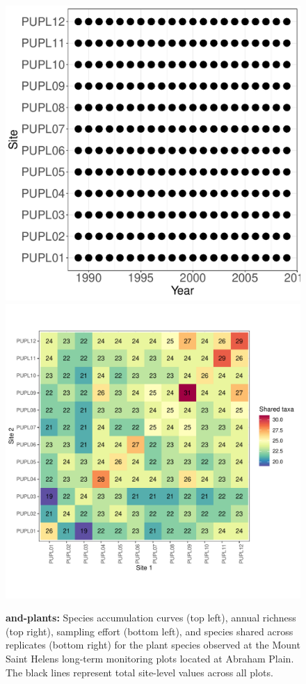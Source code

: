 \documentclass[11pt, oneside]{article}
\begin{document}
\begin{figure}[h!]
\includegraphics[scale = 0.4]{and-plants-mtStHelens_spatiotemporal_sampling_effort.pdf}
\includegraphics[scale = 0.4]{and-plants-mtStHelens_spp_shared.pdf}
\caption{{\bf and-plants:} Species accumulation curves (top left),  annual richness (top right), sampling effort (bottom left), and species shared across replicates (bottom right) for the plant species observed at the Mount Saint Helens long-term monitoring plots located at Abraham Plain. The black lines represent total site-level values across all plots.}
\label{and-plants}
\end{figure}
\end{document}

